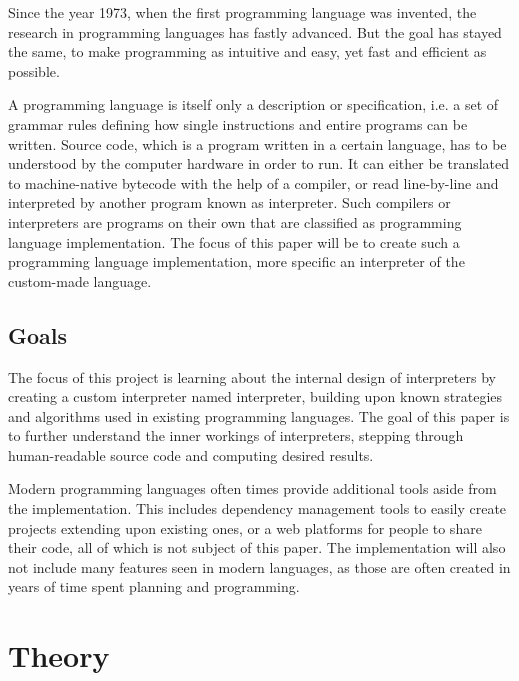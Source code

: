 \documentclass[12pt,a4paper]{article}
\begin{document}
Since the year 1973, when the first programming language was invented, the
research in programming languages has fastly advanced. But the goal has stayed
the same, to make programming as intuitive and easy, yet fast and efficient as
possible.

A programming language is itself only a description or specification, i.e. a
set of grammar rules defining how single instructions and entire programs
can be written. Source code, which is a program written in a certain language,
has to be understood by the computer hardware in order to run. It can either
be translated to machine-native bytecode with the help of a compiler, or
read line-by-line and interpreted by another program known as interpreter.
Such compilers or interpreters are programs on their own that are classified
as programming language implementation. The focus of this paper will be to
create such a programming language implementation, more specific an interpreter
of the custom-made \name language.

\subsection{Goals}
The focus of this project is learning about the internal design of interpreters
by creating a custom interpreter named \name interpreter, building upon
known strategies and algorithms used in existing programming languages.
The goal of this paper is to further understand the inner workings of
interpreters, stepping through human-readable source code and computing
desired results.

Modern programming languages often times provide additional tools aside from
the implementation. This includes dependency management tools to
easily create projects extending upon existing ones, or a web platforms for
people to share their code, all of which is not subject of this paper.
The \name implementation will also not include many features seen in modern
languages, as those are often created in years of time spent planning and
programming.

\section{Theory}
\end{document}
